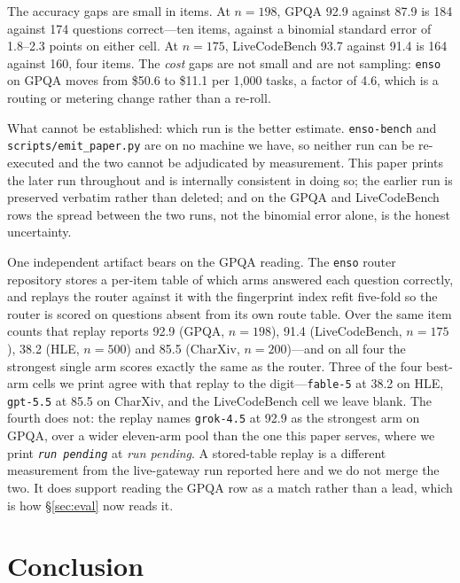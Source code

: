 \documentclass[11pt]{article}
\newcommand{\runpending}{\textit{\small run pending}}
\providecommand{\hBestGPQAname}{\runpending}
\providecommand{\hBestGPQAacc}{\runpending}
\begin{document}
The accuracy gaps are small in items. At $n{=}198$, GPQA 92.9 against 87.9 is 184
against 174 questions correct---ten items, against a binomial standard error of
1.8--2.3 points on either cell. At $n{=}175$, LiveCodeBench 93.7 against 91.4 is
164 against 160, four items. The \emph{cost} gaps are not small and are not
sampling: \texttt{enso} on GPQA moves from \$50.6 to \$11.1 per 1{,}000 tasks, a
factor of 4.6, which is a routing or metering change rather than a re-roll.

What cannot be established: which run is the better estimate. \texttt{enso-bench}
and \texttt{scripts/emit\_paper.py} are on no machine we have, so neither run can be
re-executed and the two cannot be adjudicated by measurement. This paper prints the
later run throughout and is internally consistent in doing so; the earlier run is
preserved verbatim rather than deleted; and on the GPQA and LiveCodeBench rows the
spread between the two runs, not the binomial error alone, is the honest
uncertainty.

One independent artifact bears on the GPQA reading. The \texttt{enso} router
repository stores a per-item table of which arms answered each question correctly,
and replays the router against it with the fingerprint index refit five-fold so the
router is scored on questions absent from its own route table. Over the same item
counts that replay reports 92.9 (GPQA, $n{=}198$), 91.4 (LiveCodeBench, $n{=}175$),
38.2 (HLE, $n{=}500$) and 85.5 (CharXiv, $n{=}200$)---and on all four the strongest
single arm scores exactly the same as the router. Three of the four best-arm cells we print agree with
that replay to the digit---\texttt{fable-5} at 38.2 on HLE, \texttt{gpt-5.5} at
85.5 on CharXiv, and the LiveCodeBench cell we leave blank. The fourth does not:
the replay names \texttt{grok-4.5} at 92.9 as the strongest arm on GPQA, over a
wider eleven-arm pool than the one this paper serves, where we print
\texttt{\hBestGPQAname} at \hBestGPQAacc. A stored-table replay is a different
measurement from the live-gateway run reported here and we do not merge the two.
It does support reading the GPQA row as a match rather than a lead, which is how
\S\ref{sec:eval} now reads it.

\section{Conclusion}
\end{document}
